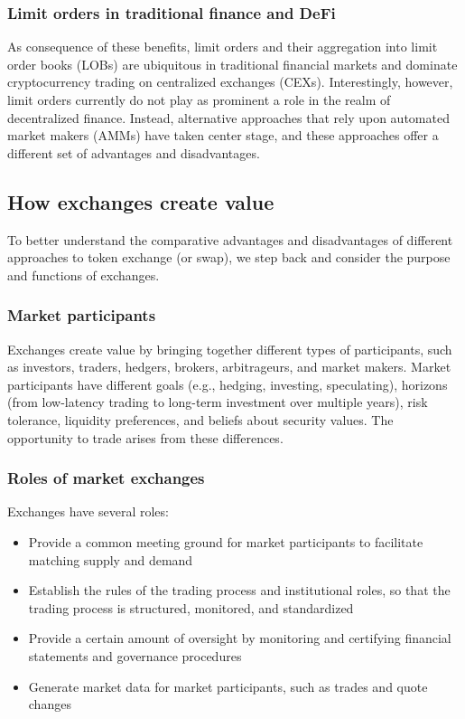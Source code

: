 \documentclass[11pt, reqno]{amsart}
\theoremstyle{definition}
\theoremstyle{remark}
\begin{document}
\subsubsection{Limit orders in traditional finance and DeFi}
As consequence of these benefits, limit orders and their aggregation into
limit order books (LOBs) are ubiquitous in traditional financial markets
and dominate cryptocurrency trading on centralized exchanges (CEXs).
Interestingly, however, limit orders currently do not play as prominent a role
in the realm of decentralized finance. Instead, alternative approaches that
rely upon automated market makers (AMMs) have taken center stage, and these
approaches offer a different set of advantages and disadvantages.

\subsection{How exchanges create value}
To better understand the comparative advantages and disadvantages of different
approaches to token exchange (or swap), we step back and consider the purpose and
functions of exchanges.

\subsubsection{Market participants}
Exchanges create value by bringing together different types of participants,
such as investors, traders, hedgers, brokers, arbitrageurs, and market makers.
Market participants have different goals (e.g., hedging, investing,
speculating), horizons (from low-latency trading to long-term investment over
multiple years), risk tolerance, liquidity preferences, and beliefs about
security values. The opportunity to trade arises from these differences.

\subsubsection{Roles of market exchanges}

Exchanges have several roles:
\begin{itemize}
    \item Provide a common meeting ground for market participants to
          facilitate matching supply and demand
	\item Establish the rules of the trading process and institutional roles, so
          that the trading process is structured, monitored, and standardized
	\item Provide a certain amount of oversight by monitoring and certifying
          financial statements and governance procedures
    \item Generate market data for market participants, such as trades and
          quote changes
\end{itemize}
\end{document}
